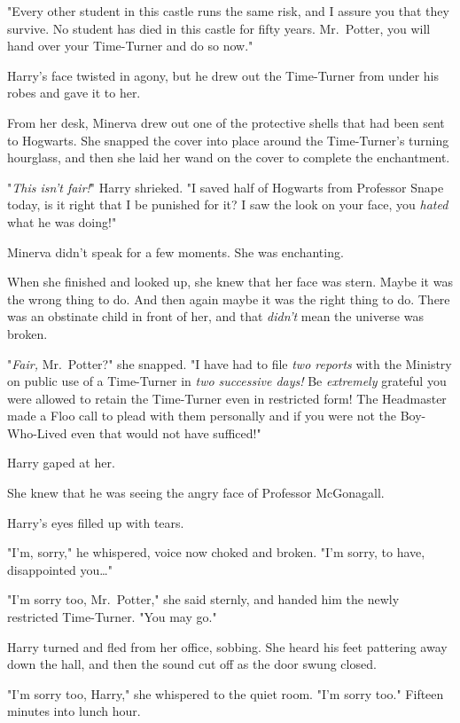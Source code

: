"Every other student in this castle runs the same risk, and I assure you that 
they survive. No student has died in this castle for fifty years. Mr.~Potter, 
you will hand over your Time-Turner and do so now."

Harry's face twisted in agony, but he drew out the Time-Turner from under his 
robes and gave it to her.

From her desk, Minerva drew out one of the protective shells that had been sent 
to Hogwarts. She snapped the cover into place around the Time-Turner's turning 
hourglass, and then she laid her wand on the cover to complete the enchantment.

"\emph{This isn't fair!}" Harry shrieked. "I saved half of Hogwarts from 
Professor Snape today, is it right that I be punished for it? I saw the look on 
your face, you \emph{hated} what he was doing!"

Minerva didn't speak for a few moments. She was enchanting.

When she finished and looked up, she knew that her face was stern. Maybe it was 
the wrong thing to do. And then again maybe it was the right thing to do. There 
was an obstinate child in front of her, and that \emph{didn't} mean the 
universe was broken.

"\emph{Fair,} Mr.~Potter?" she snapped. "I have had to file \emph{two reports} 
with the Ministry on public use of a Time-Turner in \emph{two successive days!} 
Be \emph{extremely} grateful you were allowed to retain the Time-Turner even in 
restricted form! The Headmaster made a Floo call to plead with them personally 
and if you were not the Boy-Who-Lived even that would not have sufficed!"

Harry gaped at her.

She knew that he was seeing the angry face of Professor McGonagall.

Harry's eyes filled up with tears.

"I'm, sorry," he whispered, voice now choked and broken. "I'm sorry, to have, 
disappointed you{\ldots}"

"I'm sorry too, Mr.~Potter," she said sternly, and handed him the newly 
restricted Time-Turner. "You may go."

Harry turned and fled from her office, sobbing. She heard his feet pattering 
away down the hall, and then the sound cut off as the door swung closed.

"I'm sorry too, Harry," she whispered to the quiet room. "I'm sorry too."
\sbreak
Fifteen minutes into lunch hour.

